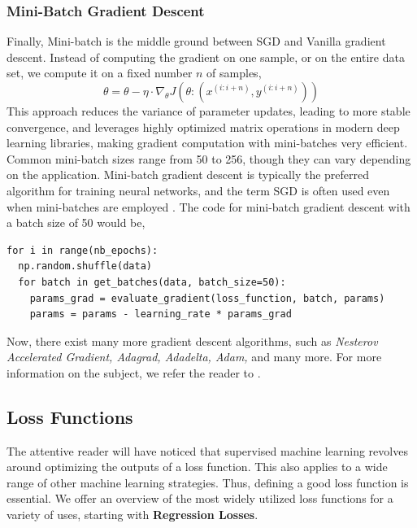 \documentclass{article}
\begin{document}
\subsubsection{Mini-Batch Gradient Descent}%
  \label{sub:Mini-Batch Gradient Descent}
  Finally, Mini-batch is the middle ground between SGD and Vanilla gradient descent. Instead of computing the gradient on one sample, or on the entire data set, we compute it on a fixed number $n$ of samples, 
  $$\theta = \theta - \eta \cdot \nabla_\theta J(\theta: (x^{(i:i+n)} ,y^{(i:i+n)}))$$
This approach reduces the variance of parameter updates, leading to more stable convergence, and leverages highly optimized matrix operations in modern deep learning libraries, making gradient computation with mini-batches very efficient. Common mini-batch sizes range from 50 to 256, though they can vary depending on the application. Mini-batch gradient descent is typically the preferred algorithm for training neural networks, and the term SGD is often used even when mini-batches are employed \citep{ruder2017overview}. The code for mini-batch gradient descent with a batch size of 50 would be, 
\begin{verbatim}
for i in range(nb_epochs): 
  np.random.shuffle(data)
  for batch in get_batches(data, batch_size=50):
    params_grad = evaluate_gradient(loss_function, batch, params) 
    params = params - learning_rate * params_grad
\end{verbatim}

Now, there exist many more gradient descent algorithms, such as \textit{Nesterov Accelerated Gradient, Adagrad, Adadelta, Adam,} and many more. For more information on the subject, we refer the reader to \cite{ruder2017overview}.
\subsection{Loss Functions}%
  \label{sub:Loss Functions}
  The attentive reader will have noticed that supervised machine learning revolves around optimizing the outputs of a loss function. This also applies to a wide range of other machine learning strategies. Thus, defining a good loss function is essential. We offer an overview of the most widely utilized loss functions for a variety of uses, starting with \textbf{Regression Losses}.
\end{document}
